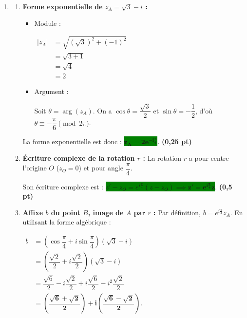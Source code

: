 \documentclass[12pt,a4paper]{article}
\begin{document}
\begin{enumerate}
    \item \begin{enumerate}
        \item \textbf{Forme exponentielle de $z_A = \sqrt{3} - i$ :}
        \begin{itemize}
            \item Module : 
            
            $\begin{aligned}
            |z_A| &= \sqrt{(\sqrt{3})^2 + (-1)^2} \\
            &= \sqrt{3 + 1} \\
            &= \sqrt{4} \\
            &= 2
            \end{aligned}$
            
            \item Argument : 
            
            Soit $\theta = \arg(z_A)$. On a $\cos\theta = \dfrac{\sqrt{3}}{2}$ et $\sin\theta = -\dfrac{1}{2}$, d'où $\theta \equiv -\dfrac{\pi}{6} \pmod{2\pi}$.
        \end{itemize}
        La forme exponentielle est donc : \colorbox{green}{$\mathbf{z_A = 2e^{-i\frac{\pi}{6}}}$}. \hfill \textbf{(0,25 pt)}

        \item \textbf{Écriture complexe de la rotation $r$ :}
        La rotation $r$ a pour centre l'origine $O$ ($z_O = 0$) et pour angle $\dfrac{\pi}{4}$. 
        
        Son écriture complexe est : \colorbox{green}{$z' - z_O = e^{i\frac{\pi}{4}}(z - z_O) \implies \mathbf{z' = e^{i\frac{\pi}{4}}z}$}. \hfill \textbf{(0,5 pt)}

        \item \textbf{Affixe $b$ du point $B$, image de $A$ par $r$ :}
        Par définition, $b = e^{i\frac{\pi}{4}}z_A$. En utilisant la forme algébrique :
        
        $\begin{aligned}
            b &= \left(\cos\dfrac{\pi}{4} + i\sin\dfrac{\pi}{4}\right)(\sqrt{3} - i) \\
            &= \left(\dfrac{\sqrt{2}}{2} + i\dfrac{\sqrt{2}}{2}\right)(\sqrt{3} - i) \\
            &= \dfrac{\sqrt{6}}{2} - i\dfrac{\sqrt{2}}{2} + i\dfrac{\sqrt{6}}{2} - i^2\dfrac{\sqrt{2}}{2} \\
            &= \mathbf{\left(\dfrac{\sqrt{6}+\sqrt{2}}{2}\right) + i \left(\dfrac{\sqrt{6}-\sqrt{2}}{2}\right)}.
        \end{aligned}$
        

\end{enumerate}
\end{enumerate}
\end{document}
